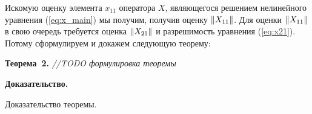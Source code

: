 Искомую оценку элемента $x_{11}$ оператора $X$, являющегося решением нелинейного уравнения (\ref{eq:x_main}) мы получим, получив оценку $\left\|X_{11}\right\|$. Для оценки $\left\|X_{11}\right\|$ в свою очередь требуется оценка $\left\|X_{21}\right\|$ и разрешимость уравнения (\ref{eq:x21}). Потому сформулируем и докажем следующую теорему:

\noindent\textbf{Теорема~2.}
{ \it //TODO формулировка теоремы}

\noindent\textbf{Доказательство.}

Доказательство теоремы.
\hfill

